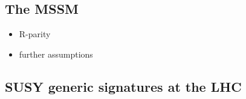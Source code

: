 \subsection{The MSSM}

\begin{itemize}
	\item R-parity
	\item further assumptions
\end{itemize}


\subsection{SUSY generic signatures at the LHC}
